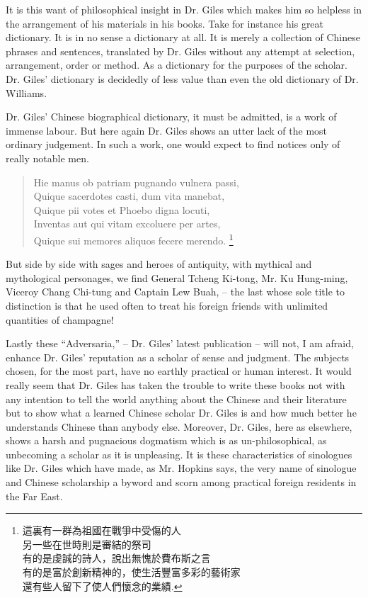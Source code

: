 It is this want of philosophical insight in Dr. Giles which makes him so helpless in the arrangement of his materials in his books.
Take for instance his great dictionary.
It is in no sense a dictionary at all.
It is merely a collection of Chinese phrases and sentences, translated by Dr. Giles without any attempt at selection, arrangement, order or method.
As a dictionary for the purposes of the scholar.
Dr. Giles' dictionary is decidedly of less value than even the old dictionary of Dr. Williams.

Dr. Giles' Chinese biographical dictionary, it must be admitted, is a work of immense labour.
But here again Dr. Giles shows an utter lack of the most ordinary judgement.
In such a work, one would expect to find notices only of really notable men.
\begin{quote}
Hie manus ob patriam pugnando vulnera passi, \\
Quique sacerdotes casti, dum vita manebat, \\
Quique pii votes et Phoebo digna locuti, \\
Inventas aut qui vitam excoluere per artes, \\
Quique sui memores aliquos fecere merendo.
\footnote{
這裏有一群為祖國在戰爭中受傷的人 \\
另一些在世時則是審結的祭司 \\
有的是虔誠的詩人，說出無愧於費布斯之言 \\
有的是富於創新精神的，使生活豐富多彩的藝術家 \\
還有些人留下了使人們懷念的業績.
}
\end{quote}
But side by side with sages and heroes of antiquity,
with mythical and mythological personages, we find General Tcheng Ki-tong,
Mr. Ku Hung-ming, Viceroy Chang Chi-tung and Captain Lew Buah,
-- the last whose sole title to distinction is that he used often to treat his foreign friends with unlimited quantities of champagne!

Lastly these ``Adversaria,'' -- Dr. Giles' latest publication
-- will not, I am afraid, enhance Dr. Giles' reputation as a scholar of sense and judgment.
The subjects chosen, for the most part, have no earthly practical or human interest.
It would really seem that Dr. Giles has taken the trouble to write these books not with any intention to tell the world anything about the Chinese and their literature but to show what a learned Chinese scholar Dr. Giles is and how much better he understands Chinese than anybody else.
Moreover, Dr. Giles, here as elsewhere, shows a harsh and pugnacious dogmatism which is as un-philosophical, as unbecoming a scholar as it is unpleasing.
It is these characteristics of sinologues like Dr. Giles which have made, as Mr. Hopkins says,
the very name of sinologue and Chinese scholarship a byword and scorn among practical foreign residents in the Far East.


